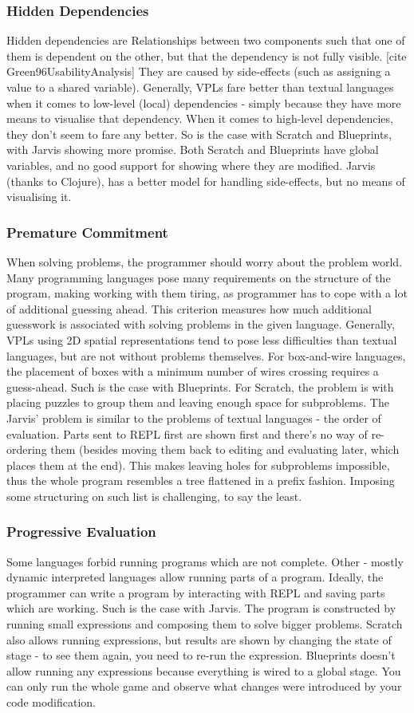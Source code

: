 \documentclass[11pt]{scrartcl}
\begin{document}
\subsubsection{Hidden Dependencies}
Hidden dependencies are
Relationships between two components such that one of them is dependent on the other, but that the dependency is not fully visible.  [cite Green96UsabilityAnalysis]
They are caused by side-effects (such as assigning a value to a shared variable). Generally, VPLs fare better than textual languages when it comes to low-level (local) dependencies - simply because they have more means to visualise that dependency. When it comes to high-level dependencies, they don’t seem to fare any better. So is the case with Scratch and Blueprints, with Jarvis showing more promise. Both Scratch and Blueprints have global variables, and no good support for showing where they are modified. Jarvis (thanks to Clojure), has a better model for handling side-effects, but no means of visualising it.
\subsubsection{Premature Commitment}
When solving problems, the programmer should worry about the problem world. Many programming languages pose many requirements on the structure of the program, making working with them tiring, as programmer has to cope with a lot of additional guessing ahead. This criterion measures how much additional guesswork is associated with solving problems in the given language. Generally, VPLs using 2D spatial representations tend to pose less difficulties than textual languages, but are not without problems themselves. For box-and-wire languages, the placement of boxes with a minimum number of wires crossing requires a guess-ahead. Such is the case with Blueprints. For Scratch, the problem is with placing puzzles to group them and leaving enough space for subproblems. The Jarvis’ problem is similar to the problems of textual languages - the order of evaluation. Parts sent to REPL first are shown first and there’s no way of re-ordering them (besides moving them back to editing and evaluating later, which places them at the end). This makes leaving holes for subproblems impossible, thus the whole program resembles a tree flattened in a prefix fashion. Imposing some structuring on such list is challenging, to say the least.
\subsubsection{Progressive Evaluation}
Some languages forbid running programs which are not complete. Other - mostly dynamic interpreted languages allow running parts of a program. Ideally, the programmer can write a program by interacting with REPL and saving parts which are working. Such is the case with Jarvis. The program is constructed by running small expressions and composing them to solve bigger problems. Scratch also allows running expressions, but results are shown by changing the state of stage - to see them again, you need to re-run the expression. Blueprints doesn’t allow running any expressions because everything is wired to a global stage. You can only run the whole game and observe what changes were introduced by your code modification.
\end{document}
